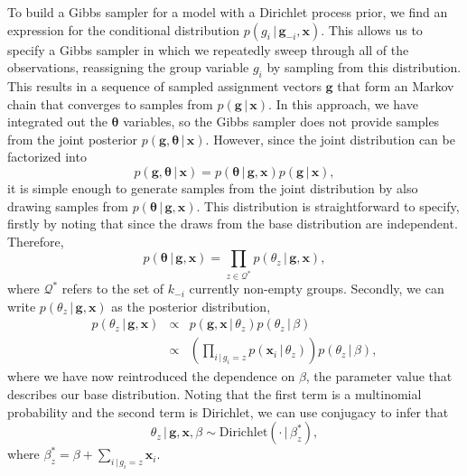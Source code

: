\documentclass[authoryear]{elsarticle}
\newcommand{\condon}{\,|\,}
\newcommand{\vctr}[1]{\bm{#1}}
\begin{document}
To build a Gibbs sampler for a model with a Dirichlet process prior,
we find an expression for the conditional distribution
$p(g_i \condon \vctr{g}_{-i},  \vctr{x})$. This allows us to specify a Gibbs
sampler in which we repeatedly sweep through all of the observations,
reassigning the group variable $g_i$ by sampling from this distribution.
This results in a sequence of sampled assignment vectors $\vctr{g}$ that form
an Markov chain that converges to samples from
$p(\vctr{g} \condon \vctr{x})$. In this approach, we have integrated out the
$\vctr{\theta}$ variables, so the Gibbs sampler does not provide samples from
the joint posterior $p(\vctr{g}, \vctr{\theta} \condon \vctr{x})$. However,
since the joint distribution can be factorized into
\[
        p(\vctr{g}, \vctr{\theta} \condon \vctr{x})
        = p(\vctr{\theta} \condon \vctr{g}, \vctr{x}) p(\vctr{g} \condon \vctr{x}),
\]
it is simple enough to generate samples from the joint distribution by also
drawing samples from $p(\vctr{\theta} \condon \vctr{g}, \vctr{x})$. This
distribution is straightforward to specify, firstly by noting that since the draws
from the base distribution are independent. Therefore,
\[
        p(\vctr{\theta} \condon \vctr{g}, \vctr{x})
        = \prod_{z \in \mathcal{Q}^*} p(\theta_z \condon \vctr{g}, \vctr{x}),
\]
where $\mathcal{Q}^*$ refers to the set of $k_{-i}$ currently non-empty groups.
Secondly, we can write $p(\theta_z \condon \vctr{g}, \vctr{x})$ as the posterior
distribution,
\begin{eqnarray*}
        p(\theta_z \condon \vctr{g}, \vctr{x})
        & \propto & p(\vctr{g}, \vctr{x} \condon \theta_z ) p(\theta_z \condon \beta) \\
        & \propto & \left( \prod_{i \condon g_i=z} p(\vctr{x}_i  \condon \theta_z ) \right)
        p(\theta_z \condon \beta),
\end{eqnarray*}
where we have now reintroduced the dependence on $\beta$, the parameter value
that describes our base distribution. Noting that the first term is a multinomial
probability and the second term is Dirichlet, we can use conjugacy to infer that
\begin{equation}
        \theta_z \condon \vctr{g}, \vctr{x}, \beta \sim
        \mbox{Dirichlet}(\cdot \condon \beta^*_{z}),
        \label{thetapost}
\end{equation}
where $\beta^*_z = \beta +  \sum_{i \condon g_i=z} \vctr{x}_i $.
\end{document}
